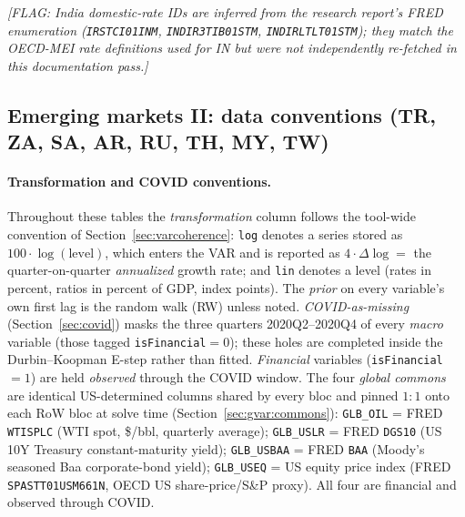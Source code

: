 \textit{[FLAG: India domestic-rate IDs are inferred from the research report's
FRED enumeration (\texttt{IRSTCI01INM}, \texttt{INDIR3TIB01STM},
\texttt{INDIRLTLT01STM}); they match the OECD-MEI rate definitions used for IN
but were not independently re-fetched in this documentation pass.]}

\subsection{Emerging markets II: data conventions (TR, ZA, SA, AR, RU, TH, MY, TW)}\label{sec:data:em2}

\paragraph{Transformation and COVID conventions.}
Throughout these tables the \emph{transformation} column follows the tool-wide
convention of Section~\ref{sec:varcoherence}: \texttt{log} denotes a series
stored as $100\cdot\log(\text{level})$, which enters the VAR and is reported as
$4\cdot\Delta\log = $ the quarter-on-quarter \emph{annualized} growth rate; and
\texttt{lin} denotes a level (rates in percent, ratios in percent of GDP, index
points). The \emph{prior} on every variable's own first lag is the random walk
(RW) unless noted. \emph{COVID-as-missing} (Section~\ref{sec:covid}) masks the
three quarters 2020Q2--2020Q4 of every \emph{macro} variable (those tagged
\texttt{isFinancial}$=0$); these holes are completed inside the
Durbin--Koopman E-step rather than fitted. \emph{Financial} variables
(\texttt{isFinancial}$=1$) are held \emph{observed} through the COVID window.
The four \emph{global commons} are identical US-determined columns shared by
every bloc and pinned $1{:}1$ onto each RoW bloc at solve time
(Section~\ref{sec:gvar:commons}): \texttt{GLB\_OIL} = FRED \texttt{WTISPLC}
(WTI spot, \$/bbl, quarterly average); \texttt{GLB\_USLR} = FRED \texttt{DGS10}
(US 10Y Treasury constant-maturity yield); \texttt{GLB\_USBAA} = FRED
\texttt{BAA} (Moody's seasoned Baa corporate-bond yield); \texttt{GLB\_USEQ} =
US equity price index (FRED \texttt{SPASTT01USM661N}, OECD US share-price/S\&P
proxy). All four are financial and observed through COVID.

